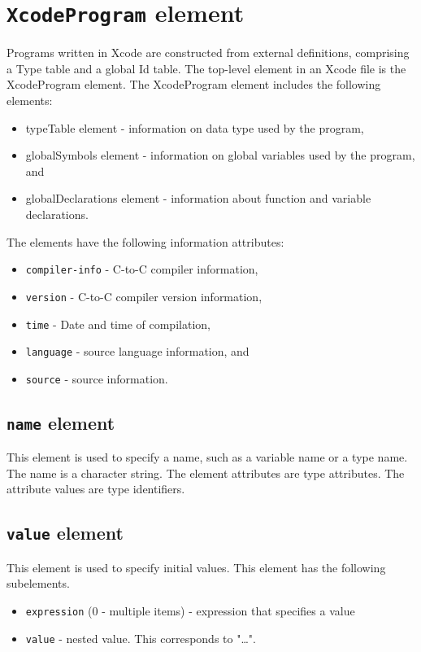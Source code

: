 \section{ {\tt XcodeProgram} element}

Programs written in Xcode are constructed from external definitions, comprising a Type table and a global Id table. The top-level element in an Xcode file is the XcodeProgram element. The XcodeProgram element includes the following elements:

\begin{itemize}
\item typeTable element - information on data type used by the program,
\item globalSymbols element - information on global variables used by the program, and
\item globalDeclarations element - information about function and variable declarations.
\end{itemize}

The elements have the following information attributes:

\begin{itemize}
\item {\tt compiler-info} - C-to-C compiler information,
\item {\tt version} - C-to-C compiler version information,
\item {\tt time} - Date and time of compilation,
\item {\tt language} - source language information, and
\item {\tt source} - source information.
\end{itemize}

\subsection{ {\tt name} element}

This element is used to specify a name, such as a variable name or a type name. The name is a character string. The element attributes are type attributes. The attribute values are type identifiers.

\subsection{ {\tt value} element}

This element is used to specify initial values. This element has the following subelements.

\begin{itemize}
\item {\tt expression} (0 - multiple items) - expression that specifies a value
\item {\tt value} - nested value. This corresponds to "{…}".
\end{itemize}

